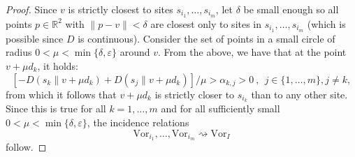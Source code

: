 \documentclass[11pt]{article}
\newcommand{\Vor}{\text{Vor}}
\newcommand{\D}[2]{D\left(#1 \parallel #2\right)}
\begin{document}
\begin{proof}
Since $v$ is strictly closest to sites $s_{i_1},\dots,s_{i_m}$, 
	let $\delta$ be small enough so all points $p\in\mathbb{R}^2$ with $\|p-v\|<\delta$ 
	are closest only to sites in $s_{i_1},\dots,s_{i_m}$ (which is possible since $D$ is continuous). 
Consider the set of points in a small circle of radius $0 < \mu < \min\{\delta,\varepsilon\}$ around $v$. 
From the above, we have that at the point $v + \mu d_k$, it holds:
	\[ \left[-\D{s_k}{v+\mu d_k} + \D{s_j}{v+\mu d_k}\right]/\mu > \alpha_{k,j} > 0 ~,~~ j\in\{1,\dots,m\}, j \ne k, \]
from which it follows that $v+\mu d_k$ is strictly closer to $s_{i_k}$ than to any other site. 
Since this is true for all $k=1,\dots,m$ and for all sufficiently small $0<\mu<\min\{\delta,\varepsilon\}$, the incidence relations
	\[ \Vor_{i_1},\dots,\Vor_{i_m} \rightsquigarrow \Vor_I \]
follow. 


\end{proof}
\end{document}
